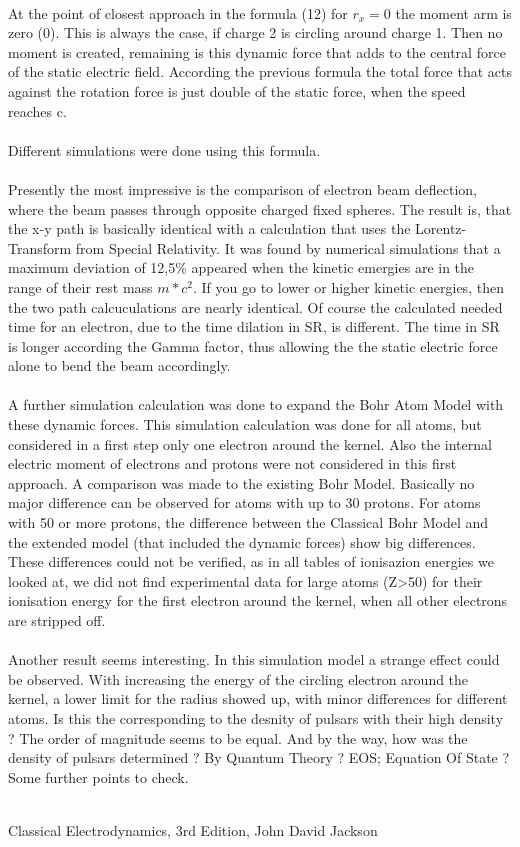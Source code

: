 \documentclass[10pt,titlepage]{article}
\begin{document}
\\
At the point of closest approach in the formula (12) for $r_x = 0$ the moment arm is zero (0). 
This is always the case, if charge 2 is circling around charge 1. Then no moment is created, remaining is this dynamic force that adds to the central force of the static electric field.
According the previous formula the total force that acts against the rotation force is just double of the static force, when the speed reaches c.
\\
\\
Different simulations were done using this formula.        					
\\
\\
Presently the most impressive is the comparison of electron beam deflection, where the beam passes through opposite charged fixed spheres.
The result is, that the x-y path is basically identical with a calculation that uses the Lorentz-Transform from Special Relativity.
It was found by numerical simulations that a maximum deviation of 12,5\% appeared when the kinetic emergies are in the range of their rest mass $m*c^2$. If you go to lower or higher kinetic energies, then the two path calcuculations are nearly identical. Of course the calculated needed time for an electron, due to the time dilation in SR, is different. The time in SR is longer according the Gamma factor, thus allowing the the static electric force alone to bend the beam accordingly.
\\
\\
A further simulation calculation was done to expand the Bohr Atom Model with these dynamic forces.
This simulation calculation was done for all atoms, but considered in a first step only one electron around the kernel. Also the internal electric moment of electrons and protons were not considered in this first approach. A comparison was made to the existing Bohr Model. Basically no major difference can be observed for atoms with up to 30 protons. For atoms with 50 or more protons, the difference between the Classical Bohr Model and the extended model (that included the dynamic forces) show big differences. These differences could not be verified, as in all tables of ionisazion energies we looked at, we did not find experimental data for large atoms (Z>50) for their ionisation energy for the first electron around the kernel, when all other electrons are stripped off.
\\
\\
Another result seems interesting. In this simulation model a strange effect could be observed. With increasing the energy of the circling electron around the kernel, a lower limit for the radius showed up, with minor differences for different atoms. Is this the corresponding to the desnity of pulsars with their high density ?  The order of magnitude seems to be equal. And by the way, how was the density of pulsars determined ?  By Quantum Theory ? EOS; Equation Of State ? Some further points to check.
\\
\\



\begin{thebibliography}{100}
   Classical Electrodynamics,  3rd Edition, John David Jackson
\end{thebibliography}
\end{document}
